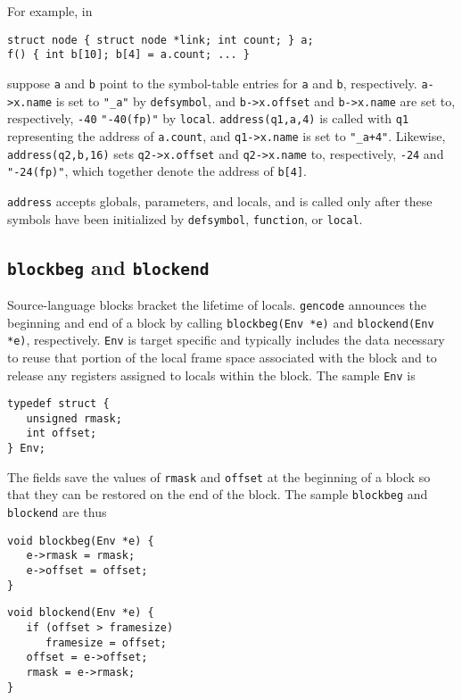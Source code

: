 For example, in
\begin{verbatim}
struct node { struct node *link; int count; } a;
f() { int b[10]; b[4] = a.count; ... }
\end{verbatim}
suppose \verb|a| and \verb|b| point to the symbol-table entries
for \verb|a| and \verb|b|, respectively.
\verb|a->x.name| is set to \verb|"_a"| by \verb|defsymbol|, and
\verb|b->x.offset| and \verb|b->x.name| are set to, respectively,
\verb|-40| \verb|"-40(fp)"| by \verb|local|.
\verb|address(q1,a,4)| is called with \verb|q1| representing the address
of \verb|a.count|, and \verb|q1->x.name| is set to \verb|"_a+4"|.
Likewise, \verb|address(q2,b,16)| sets \verb|q2->x.offset|
and \verb|q2->x.name| to, respectively, \verb|-24| and \verb|"-24(fp)"|,
which together denote the address of \verb|b[4]|.

\verb|address| accepts globals, parameters, and locals,
and is called only after these symbols have been initialized
by {\tt defsymbol}, {\tt function}, or {\tt local}.

\subsection{{\tt blockbeg} and \tt blockend}

\label{blockbeg}\label{blockend}
Source-language blocks bracket the lifetime of locals.
\verb|gencode| announces the beginning and end of a block
by calling \verb|blockbeg(Env *e)| and \verb|blockend(Env *e)|, respectively.
\verb|Env| is target specific and typically includes
the data necessary to reuse that portion of the local frame
space associated with the block
and to release any registers assigned to locals within the block.
The sample \verb|Env| is
\begin{verbatim}
typedef struct {
   unsigned rmask;
   int offset;
} Env;
\end{verbatim}
The fields save the values of \verb|rmask| and \verb|offset| at the beginning
of a block so that they can be restored on the end of the block.
The sample \verb|blockbeg| and \verb|blockend| are thus

\noindent
\begin{minipage}[t]{.5\textwidth}
\vspace{\parskip}
\begin{verbatim}
void blockbeg(Env *e) {
   e->rmask = rmask;
   e->offset = offset;
}
\end{verbatim}
\vspace{\parskip}
\end{minipage}
\begin{minipage}[t]{.5\textwidth}
\vspace{\parskip}
\begin{verbatim}
void blockend(Env *e) {
   if (offset > framesize)
      framesize = offset;
   offset = e->offset;
   rmask = e->rmask;
}
\end{verbatim}
\vspace{\parskip}
\end{minipage}

